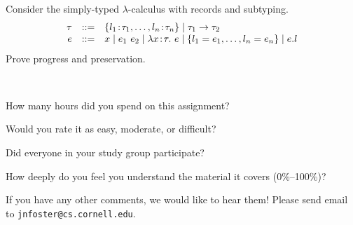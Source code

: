 \documentclass[10pt]{article}
\begin{document}
\begin{exercise}
  Consider the simply-typed $\lambda$-calculus with records and
  subtyping.
%
\[
\begin{array}{rcl}
\tau & ::= & \{ l_1 \!:\! \tau_1, \dots, l_n \!:\! \tau_n \} \mid \tau_1 \rightarrow \tau_2\\
e    & ::= & x \mid e_1~e_2 \mid \lambda x \!:\!\tau .~ e \mid \{ l_1 = e_1 , \dots, l_n = e_n \} \mid e.l\\
\end{array}
\]
%
Prove progress and preservation. 
\end{exercise}

\begin{debriefing} \hfill\\[-4ex]
\begin{enumerate*}
\item How many hours did you spend on this assignment? 
\item Would you rate it as easy, moderate, or difficult? 
\item Did everyone in your study group participate? 
\item How deeply do you feel you understand the material it covers (0\%--100\%)? 
\item If you have any other comments, we would like to hear them!
  Please send email to \texttt{jnfoster@cs.cornell.edu}.
\end{enumerate*}
\end{debriefing}
\end{document}
